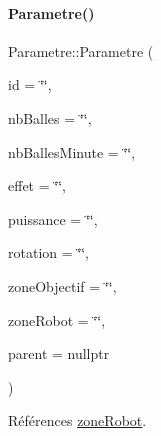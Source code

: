 \paragraph{\texorpdfstring{Parametre()}{Parametre()}}
{\footnotesize\ttfamily Parametre\+::\+Parametre (\begin{DoxyParamCaption}\item[{Q\+String}]{id = {\ttfamily \char`\"{}\char`\"{}},  }\item[{Q\+String}]{nb\+Balles = {\ttfamily \char`\"{}\char`\"{}},  }\item[{Q\+String}]{nb\+Balles\+Minute = {\ttfamily \char`\"{}\char`\"{}},  }\item[{Q\+String}]{effet = {\ttfamily \char`\"{}\char`\"{}},  }\item[{Q\+String}]{puissance = {\ttfamily \char`\"{}\char`\"{}},  }\item[{Q\+String}]{rotation = {\ttfamily \char`\"{}\char`\"{}},  }\item[{Q\+String}]{zone\+Objectif = {\ttfamily \char`\"{}\char`\"{}},  }\item[{Q\+String}]{zone\+Robot = {\ttfamily \char`\"{}\char`\"{}},  }\item[{Q\+Object $\ast$}]{parent = {\ttfamily nullptr} }\end{DoxyParamCaption})\hspace{0.3cm}{\ttfamily [explicit]}}



Références \hyperlink{class_parametre_a85c2e24c35cad5304b5e2edf7289c9c3}{zone\+Robot}.


